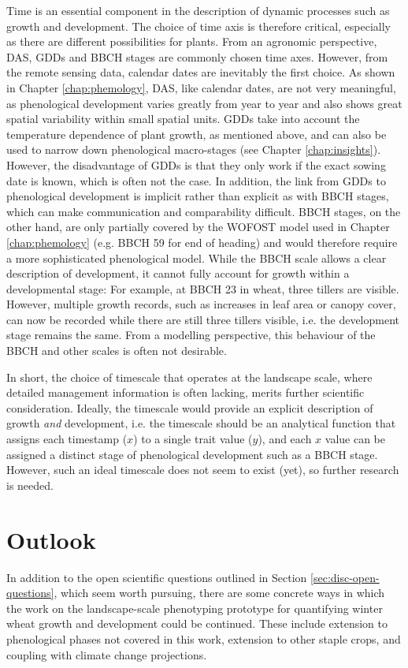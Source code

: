 Time is an essential component in the description of dynamic processes such as growth and development. The choice of time axis is therefore critical, especially as there are different possibilities for plants. From an agronomic perspective, \gls{DAS}, \gls{GDD}s and \gls{BBCH} stages are commonly chosen time axes. However, from the remote sensing data, calendar dates are inevitably the first choice. As shown in Chapter \ref{chap:phemology}, \gls{DAS}, like calendar dates, are not very meaningful, as phenological development varies greatly from year to year and also shows great spatial variability within small spatial units. \gls{GDD}s take into account the temperature dependence of plant growth, as mentioned above, and can also be used to narrow down phenological macro-stages (see Chapter \ref{chap:insights}). However, the disadvantage of \gls{GDD}s is that they only work if the exact sowing date is known, which is often not the case. In addition, the link from \gls{GDD}s to phenological development is implicit rather than explicit as with \gls{BBCH} stages, which can make communication and comparability difficult. \gls{BBCH} stages, on the other hand, are only partially covered by the \gls{WOFOST} model used in Chapter \ref{chap:phemology} (e.g. \gls{BBCH} 59 for end of heading) and would therefore require a more sophisticated phenological model. While the \gls{BBCH} scale allows a clear description of development, it cannot fully account for growth within a developmental stage: For example, at \gls{BBCH} 23 in wheat, three tillers are visible. However, multiple growth records, such as increases in leaf area or canopy cover, can now be recorded while there are still three tillers visible, i.e. the development stage remains the same. From a modelling perspective, this behaviour of the \gls{BBCH} and other scales is often not desirable.
 
In short, the choice of timescale that operates at the landscape scale, where detailed management information is often lacking, merits further scientific consideration. Ideally, the timescale would provide an explicit description of growth \textsl{and} development, i.e. the timescale should be an analytical function that assigns each timestamp ($x$) to a single trait value ($y$), and each $x$ value can be assigned a distinct stage of phenological development such as a \gls{BBCH} stage. However, such an ideal timescale does not seem to exist (yet), so further research is needed.

\section{Outlook}
In addition to the open scientific questions outlined in Section \ref{sec:disc-open-questions}, which seem worth pursuing, there are some concrete ways in which the work on the landscape-scale phenotyping prototype for quantifying winter wheat growth and development could be continued. These include extension to phenological phases not covered in this work, extension to other staple crops, and coupling with climate change projections.

